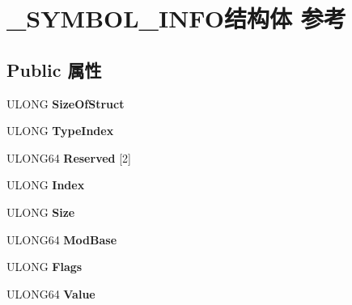 \hypertarget{struct___s_y_m_b_o_l___i_n_f_o}{}\section{\+\_\+\+S\+Y\+M\+B\+O\+L\+\_\+\+I\+N\+F\+O结构体 参考}
\label{struct___s_y_m_b_o_l___i_n_f_o}
\subsection*{Public 属性}
\begin{DoxyCompactItemize}
\item 
\mbox{\label{struct___s_y_m_b_o_l___i_n_f_o_a226ca3f3ecbfc1c109c4de0833984033}} 
U\+L\+O\+NG {\bfseries Size\+Of\+Struct}
\item 
\mbox{\label{struct___s_y_m_b_o_l___i_n_f_o_a0fff4d394c8a0b27aa8cca2657f3f66a}} 
U\+L\+O\+NG {\bfseries Type\+Index}
\item 
\mbox{\label{struct___s_y_m_b_o_l___i_n_f_o_abb49d46d940ec6c42023ebefc4d3c904}} 
U\+L\+O\+N\+G64 {\bfseries Reserved} \mbox{[}2\mbox{]}
\item 
\mbox{\label{struct___s_y_m_b_o_l___i_n_f_o_ae34656e3389edc909ade8897cab198e4}} 
U\+L\+O\+NG {\bfseries Index}
\item 
\mbox{\label{struct___s_y_m_b_o_l___i_n_f_o_af876d831979e756ec7501147649533bd}} 
U\+L\+O\+NG {\bfseries Size}
\item 
\mbox{\label{struct___s_y_m_b_o_l___i_n_f_o_a06061ee643c66279bb501962cfa78fae}} 
U\+L\+O\+N\+G64 {\bfseries Mod\+Base}
\item 
\mbox{\label{struct___s_y_m_b_o_l___i_n_f_o_abe4f02af09da701b660bce7dd67f02d8}} 
U\+L\+O\+NG {\bfseries Flags}
\item 
\mbox{\label{struct___s_y_m_b_o_l___i_n_f_o_a6c4e206207a1fcaa2e7b33ef785bf60f}} 
U\+L\+O\+N\+G64 {\bfseries Value}
\item 

\end{DoxyCompactItemize}
